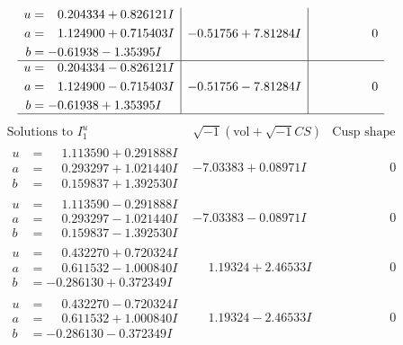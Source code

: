 \documentclass[1p]{elsarticle_modified}
\theoremstyle{definition}
\newcommand{\I}{\sqrt{-1}}
\begin{document}
$$\begin{array}{c|c|c}
\begin{aligned}
u &= \phantom{-}0.204334 + 0.826121 I \\
a &= \phantom{-}1.124900 + 0.715403 I \\
b &= -0.61938 - 1.35395 I\end{aligned}
 & -0.51756 + 7.81284 I & \phantom{-0.000000 } 0 \\ \hline\begin{aligned}
u &= \phantom{-}0.204334 - 0.826121 I \\
a &= \phantom{-}1.124900 - 0.715403 I \\
b &= -0.61938 + 1.35395 I\end{aligned}
 & -0.51756 - 7.81284 I & \phantom{-0.000000 } 0\\
 \hline 
 \end{array}$$\newpage$$\begin{array}{c|c|c}  
\text{Solutions to }I^u_{1}& \I (\text{vol} + \sqrt{-1}CS) & \text{Cusp shape}\\
 \hline 
\begin{aligned}
u &= \phantom{-}1.113590 + 0.291888 I \\
a &= \phantom{-}0.293297 + 1.021440 I \\
b &= \phantom{-}0.159837 + 1.392530 I\end{aligned}
 & -7.03383 + 0.08971 I & \phantom{-0.000000 } 0 \\ \hline\begin{aligned}
u &= \phantom{-}1.113590 - 0.291888 I \\
a &= \phantom{-}0.293297 - 1.021440 I \\
b &= \phantom{-}0.159837 - 1.392530 I\end{aligned}
 & -7.03383 - 0.08971 I & \phantom{-0.000000 } 0 \\ \hline\begin{aligned}
u &= \phantom{-}0.432270 + 0.720324 I \\
a &= \phantom{-}0.611532 - 1.000840 I \\
b &= -0.286130 + 0.372349 I\end{aligned}
 & \phantom{-}1.19324 + 2.46533 I & \phantom{-0.000000 } 0 \\ \hline\begin{aligned}
u &= \phantom{-}0.432270 - 0.720324 I \\
a &= \phantom{-}0.611532 + 1.000840 I \\
b &= -0.286130 - 0.372349 I\end{aligned}
 & \phantom{-}1.19324 - 2.46533 I & \phantom{-0.000000 } 0 \\ \hline\begin{aligned}

\end{aligned}
\end{array}$$
\end{document}
